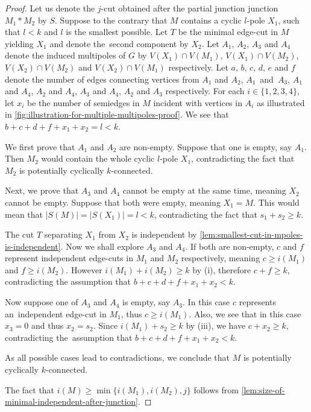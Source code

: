 \documentclass[12pt, twoside]{book}
\begin{document}
\begin{proof}
	Let us denote the $j$-cut obtained after the partial junction junction $M_1*M_2$ by $S$. Suppose to the contrary that $M$ contains a cyclic $l$-pole $X_1$, such that $l<k$ and $l$ is the smallest possible. Let $T$ be the minimal edge-cut in $M$ yielding $X_1$ and denote the~second component by $X_2$. Let $A_1,\,A_2,\,A_3$ and $A_4$ denote the induced multipoles of $G$ by ${V(X_1)\cap V(M_1)}$, ${V(X_1)\cap V(M_2)}$, ${V(X_2)\cap V(M_2)}$ and ${V(X_2)\cap V(M_1)}$ respectively. Let $a,\,b,\,c,\,d,\,e$ and $f$ denote the number of edges connecting vertices from $A_1$ and $A_2$, \mbox{$A_1$ and $A_3$}, $A_1$ and $A_4$, $A_2$ and $A_4$, $A_3$ and $A_4$, $A_2$ and $A_3$ respectively. For each $i\in\{1,2,3,4\}$, let $x_i$ be the number of semiedges in $M$ incident with vertices in $A_i$ as illustrated in \cref{fig:illustration-for-multiple-multipoles-proof}. We see that ${b+c+d+f+x_1+x_2=l<k}$.
	
	We first prove that $A_1$ and $A_2$ are non-empty. Suppose that one is empty, say $A_1$. Then $M_2$ would contain the whole cyclic $l$-pole $X_1$, contradicting the fact that $M_2$ is potentially cyclically $k$-connected.
	
	Next, we prove that $A_3$ and $A_4$ cannot be empty at the same time, meaning $X_2$ cannot be empty. Suppose that both were empty, meaning $X_1=M$. This would mean that $|S(M)|=|S(X_1)|=l<k$, contradicting the fact that $s_1+s_2\geq k$.
	
	The cut $T$ separating $X_1$ from $X_2$ is independent by \cref{lem:smallest-cut-in-mpoles-is-independent}. Now we shall explore $A_3$ and $A_4$. If both are non-empty, $c$ and $f$ represent independent edge-cuts in $M_1$ and $M_2$ respectively, meaning ${c\geq i(M_1)}$ and ${f\geq i(M_2)}$. However ${i(M_1)+i(M_2)\geq k}$ by (i), therefore $c+f\geq k$, contradicting the assumption that ${b+c+d+f+x_1+x_2<k}$.
	
	Now suppose one of $A_3$ and $A_4$ is empty, say $A_3$. In this case $c$ represents an~independent edge-cut in $M_1$, thus $c\geq i(M_1)$. Also, we see that in this case $x_3=0$ and thus $x_2=s_2$. Since $i(M_1)+s_2\geq k$ by (iii), we have $c+x_2\geq k$, contradicting the~assumption that ${b+c+d+f+x_1+x_2<k}$.
	
	As all possible cases lead to contradictions, we conclude that $M$ is potentially cyclically \mbox{$k$-connected}.
	
	The fact that ${i(M)\geq \min\{i(M_1), i(M_2), j\}}$ follows from \cref{lem:size-of-minimal-independent-after-junction}.
\end{proof}
\end{document}
